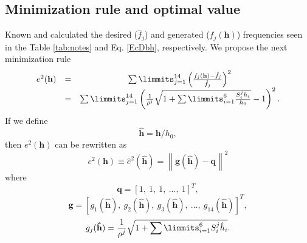 \documentclass[11pt,twocolumn]{article}
\begin{document}
\subsection{Minimization rule and optimal value}
Known and calculated the desired ($\hat{f}_j$) and generated ($f_j(\mathbf{h})$) frequencies 
seen in the Table \ref{tab:notes}  and Eq. \ref{EcDbh}, respectively.
We propose the next minimization rule
\begin{equation}
\label{eq:minimization}
\begin{matrix}
e^2(\mathbf{h}) & = & \sum\limmits_{j=1}^{14}\left(\frac{f_{j}(\mathbf{h})-\hat{f}_{j}}{\hat{f}_{j}}\right)^2\\
~ & = & \sum\limmits_{j=1}^{14}\left(\frac{1}{\rho^j}\sqrt{1+\sum\limmits_{i=1}^{6} \frac{S_{i}^{j} h_i}{h_0}}-1\right)^2.
\end{matrix}
\end{equation}
If we define
\begin{equation}\label{eq:varchange}
\mathbf{\hat{h}}=\mathbf{h}/h_0,
\end{equation}
then $e^2(\mathbf{h})$ can be rewritten as
\begin{equation}
e^2(\mathbf{h}) \equiv \hat{e}^2(\mathbf{\hat{h}}) = \left\|\mathbf{g}(\mathbf{\hat{h}})-\mathbf{q}\right\|^2
\end{equation}
where
\begin{equation}
\mathbf{q}=[1,~1,~1,~...,~1]^T,
\end{equation}
\begin{equation}
\mathbf{g}=[g_1(\mathbf{\hat{h}}),~g_2(\mathbf{\hat{h}}),~g_3(\mathbf{\hat{h}}),~...,~g_{14}(\mathbf{\hat{h}})]^T,
\end{equation}
\begin{equation}
g_j (\mathbf{\hat{h}})=\frac{1}{\rho^j}\sqrt{1+\sum\limmits_{i=1}^{6} S_{i}^{j} \hat{h}_i}.
\end{equation}
\end{document}
